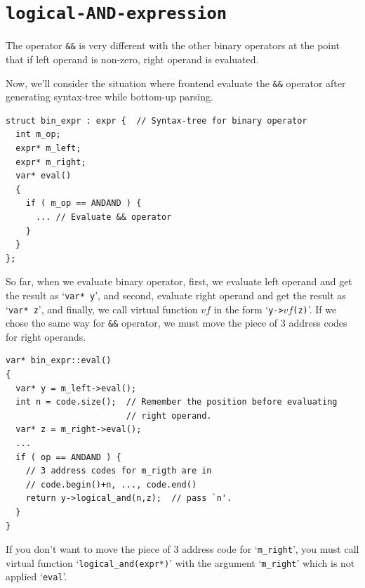 \section{\tt{logical-AND-expression}}
\label{expr_e022}
The operator {\tt{\&\&}} is very different with the other binary
operators at the point that if left operand is non-zero, right operand
is evaluated.

Now, we'll consider the situation where frontend evaluate the
{\tt{\&\&}} operator after generating syntax-tree while
bottom-up parsing.
\begin{verbatim}
struct bin_expr : expr {  // Syntax-tree for binary operator
  int m_op;
  expr* m_left;
  expr* m_right; 
  var* eval()
  {
    if ( m_op == ANDAND ) {
      ... // Evaluate && operator
    }
  }
};
\end{verbatim}
So far, when we evaluate binary operator,
first, we evaluate left operand and get the
result as `{\tt{var* y}}', and second,
evaluate right operand and get the result as
`{\tt{var* z}}', and finally, we call virtual function
$vf$ in the form `{\tt{y->$vf$(z)}}'.
If we chose the same way for {\tt{\&\&}} operator,
we must move the piece of 3 address codes for right operands.
\begin{verbatim}
var* bin_expr::eval()
{
  var* y = m_left->eval();
  int n = code.size();  // Remember the position before evaluating
                        // right operand.
  var* z = m_right->eval();
  ...
  if ( op == ANDAND ) {
    // 3 address codes for m_rigth are in
    // code.begin()+n, ..., code.end()
    return y->logical_and(n,z);  // pass `n'.
  }
}
\end{verbatim}
If you don't want to move the piece of 3 address code for
`{\tt{m\_right}}', you must call virtual function
`{\tt{logical\_and(expr*)}}' with the argument `{\tt{m\_right}}' 
which is not applied `{\tt{eval}}'.

